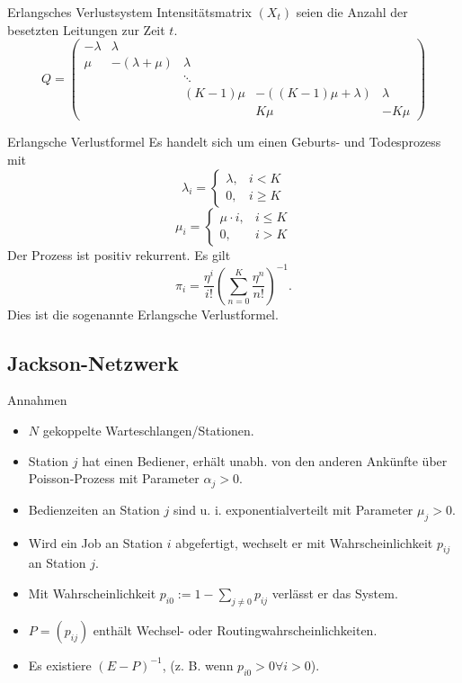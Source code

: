 \begin{karte}{Erlangsches Verlustsystem Intensitätsmatrix}
    \((X_t)\) seien die Anzahl der besetzten Leitungen 
    zur Zeit \(t\).
    \[ Q = \begin{pmatrix}
        -\lambda & \lambda & & & \\
        \mu & -(\lambda + \mu) & \lambda & & \\
        & & \ddots & & \\
        & & (K-1)\mu &-((K-1)\mu + \lambda) & \lambda \\
        & & & K\mu & -K\mu
    \end{pmatrix} \]
\end{karte}

\begin{karte}{Erlangsche Verlustformel}
    Es handelt sich um einen Geburts- und Todesprozess 
    mit 
    \[ \lambda_i = \begin{cases}
        \lambda, &i<K \\
        0, & i\geq K
    \end{cases} \]
    \[ \mu_i = \begin{cases}
        \mu \cdot i, &i \leq K \\
        0, &i > K
    \end{cases} \]
    Der Prozess ist positiv rekurrent.
    Es gilt 
    \[ \pi_i = \frac{\eta^i}{i!} \left( 
        \sum_{n=0}^K \frac{\eta^n}{n!} 
    \right)^{-1}. \]
    Dies ist die sogenannte Erlangsche Verlustformel.
\end{karte}

\subsection*{Jackson-Netzwerk}

\begin{karte}{Annahmen}
    \begin{itemize}
        \item \(N\) gekoppelte Warteschlangen/Stationen.
        \item Station \(j\) hat einen Bediener, erhält unabh. 
        von den anderen Ankünfte über Poisson-Prozess mit Parameter 
        \(\alpha_j > 0\).
        \item Bedienzeiten an Station \(j \) 
        sind u. i. exponentialverteilt mit Parameter 
        \(\mu_j > 0\).
        \item Wird ein Job an Station \(i\) abgefertigt, 
        wechselt er mit Wahrscheinlichkeit \(p_{ij}\) an Station \(j\).
        \item Mit Wahrscheinlichkeit \(p_{i0} := 1 - \sum_{j\neq 0} p_{ij}\) 
        verlässt er das System.
        \item \(P = (p_{ij})\) enthält Wechsel- oder Routingwahrscheinlichkeiten.
        \item Es existiere \((E-P)^{-1}\), (z. B. wenn \(p_{i0}>0\forall i>0\)).
    \end{itemize}
\end{karte}

